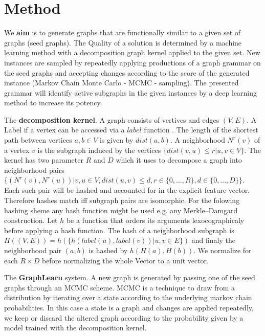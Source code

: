 \documentclass{article}
\begin{document}
\section{Method}

We \textbf{ aim }is to generate graphs that are functionally similar to a given set of graphs (seed graphs).
The Quality of a solution is determined by a machine learning method with a decomposition graph 
kernel applied to the given set. New instances are sampled by repeatedly applying productions
of a graph grammar on the seed graphs and accepting changes according to the score of the generated
instance (Markov Chain Monte Carlo - MCMC - sampling). The presented grammar will identify
active subgraphs in the given instances by a deep learning method to increase its potency. 
 
The \textbf{decomposition kernel}. A graph consists of vertives and edges $(V,E)$. 
A Label if a vertex can be accessed via a $label$ function .
The length of the shortest path between vertices $a,b \in V$ is given by $dist(a,b)$.
A neighborhood $N^r(v)$ of a
vertex $v$ is the subgraph induced by the vertices $\{dist(v,u) \leq r | u,v \in V \}$.
The kernel has two parameter $R$ and $D$ which it uses to decompose a graph into neighborhood pairs
$\{ (N^r(v), N^r(u)) | v,u \in V , dist(u,v) \leq d, r \in \{0,...,R\}, d\in \{0,...,D\}  \}$. 
Each such pair will be hashed and accounted for in the explicit feature vector.
Therefore  hashes match iff subgraph pairs are isomorphic.
For the folowing hashing sheme any hash function might be used e.g. any Merkle--Damgard construction.
Let $h$ be a function that orders its arguments lexocographicaly before applying a hash function. 
The hash of a neighborhood subgraph is $H((V,E)) = h(\{ h(label(u), label(v)) | u,v \in E \})$
and finaly the neighborhood pair $(a,b)$ is hashed by $h(H(a),H(b))$.
We normalize for each $R \times D$ before normalizing the whole Vector to a unit vector.

The \textbf{GraphLearn} system. A new graph is generated by passing one of the seed graphs
through an MCMC scheme. MCMC is a technique to draw from a distribution by iterating over 
a state according to the underlying markov chain probabilities. In this case a state is a 
graph and changes are applied repeatedly, we keep or discard the altered graph according
to the probability given by a model trained with the decomposition kernel. 
\end{document}
